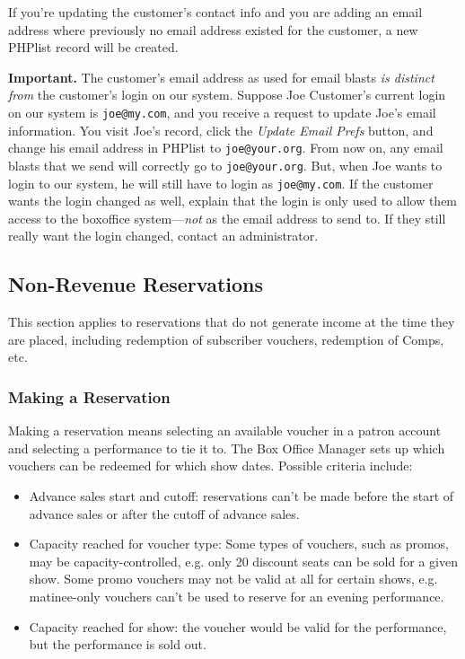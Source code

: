 If you're updating the customer's contact info and you are adding an
email address where previously no email address existed for the
customer, a new PHPlist record will be created.  

\textbf{Important.}  The customer's email address as used for email
blasts \emph{is distinct from} the customer's login on our system.
Suppose Joe Customer's current login on our system is \verb+joe@my.com+,
and you receive a request to update Joe's email information.  You visit
Joe's record, click the \emph{Update Email Prefs} button, and change his
email address in PHPlist to \verb+joe@your.org+.  From now on, any email
blasts that we send will correctly go to \verb+joe@your.org+.  But, when
Joe wants to login to our system, he will still have to login as
\verb+joe@my.com+.  If the customer wants the login changed as
well, explain that the login is only used to allow them access to the
boxoffice system---\emph{not} as the email address to send to.  If they
still really want the login changed, contact an administrator.


\subsection{Non-Revenue Reservations}

This section applies to reservations that do not generate income at the
time they are placed, including redemption of subscriber vouchers,
redemption of Comps, etc.

\subsubsection{Making a Reservation}
\label{sec:reservation-details}

Making a reservation means selecting an available voucher in a patron
account and selecting a performance to tie it to.  The Box Office
Manager sets up which vouchers can be redeemed for which show dates.
Possible criteria include:

\begin{itemize}
\item Advance sales start and cutoff: reservations can't be made before
  the start of advance sales or after the cutoff of advance sales.
\item Capacity reached for voucher type: Some types of vouchers, such as
  promos, may be capacity-controlled, e.g. only 20 discount seats can be
  sold for a given show.  Some promo vouchers may not be valid at all
  for certain shows, e.g. matinee-only vouchers can't be used to reserve
  for an evening performance.
\item Capacity reached for show: the voucher would be valid for the
  performance, but the performance is sold out.
\end{itemize}

